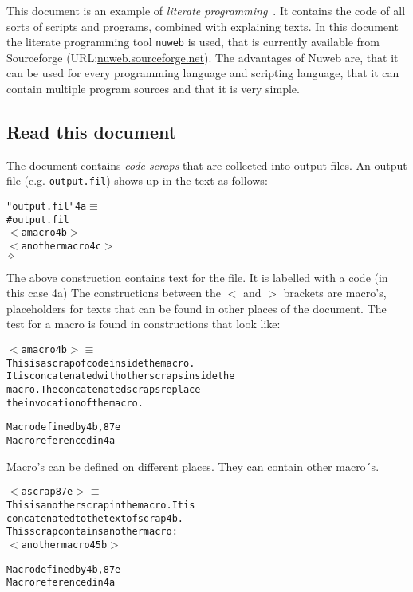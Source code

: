 \documentclass[twoside]{artikel3}
\begin{document}
This document is an example of \emph{literate
  programming}~\cite{Knuth:1983:LP}. It contains the code of all sorts
of scripts and programs, combined with explaining texts. In this
document the literate programming tool \texttt{nuweb} is used, that is
currently available from Sourceforge
(URL:\url{nuweb.sourceforge.net}). The advantages of Nuweb are, that
it can be used for every programming language and scripting language, that
it can contain multiple program sources and that it is very simple.


\subsection{Read this document}
\label{sec:read}

The document contains \emph{code scraps} that are collected into
output files. An output file (e.g. \texttt{output.fil}) shows up in the text as follows:

\begin{alltt}
"output.fil" \textrm{4a \(\equiv\)}
      # output.fil
      \textrm{\(<\) a macro 4b \(>\)}
      \textrm{\(<\) another macro 4c \(>\)}
      \(\diamond\)

\end{alltt}

The above construction contains text for the file. It is labelled with
a code (in this case 4a)  The constructions between the \(<\) and
\(>\) brackets are macro's, placeholders for texts that can be found
in other places of the document. The test for a macro is found in
constructions that look like:

\begin{alltt}
\textrm{\(<\) a macro 4b \(>\) \(\equiv\)}
     This is a scrap of code inside the macro.
     It is concatenated with other scraps inside the
     macro. The concatenated scraps replace
     the invocation of the macro.

{\footnotesize\textrm Macro defined by 4b, 87e}
{\footnotesize\textrm Macro referenced in 4a}
\end{alltt}

Macro's can be defined on different places. They can contain other macro´s.

\begin{alltt}
\textrm{\(<\) a scrap 87e \(>\) \(\equiv\)}
     This is another scrap in the macro. It is
     concatenated to the text of scrap 4b.
     This scrap contains another macro:
     \textrm{\(<\) another macro 45b \(>\)}

{\footnotesize\textrm Macro defined by 4b, 87e}
{\footnotesize\textrm Macro referenced in 4a}
\end{alltt}
\end{document}
